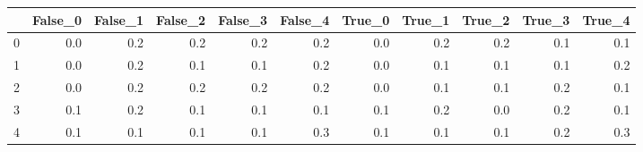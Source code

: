 \begin{tabular}{lrrrrrrrrrr}
\toprule
{} &  False\_0 &  False\_1 &  False\_2 &  False\_3 &  False\_4 &  True\_0 &  True\_1 &  True\_2 &  True\_3 &  True\_4 \\ \hline
\midrule
0 &      0.0 &      0.2 &      0.2 &      0.2 &      0.2 &     0.0 &     0.2 &     0.2 &     0.1 &     0.1 \\ \hline
1 &      0.0 &      0.2 &      0.1 &      0.1 &      0.2 &     0.0 &     0.1 &     0.1 &     0.1 &     0.2 \\ \hline
2 &      0.0 &      0.2 &      0.2 &      0.2 &      0.2 &     0.0 &     0.1 &     0.1 &     0.2 &     0.1 \\ \hline
3 &      0.1 &      0.2 &      0.1 &      0.1 &      0.1 &     0.1 &     0.2 &     0.0 &     0.2 &     0.1 \\ \hline
4 &      0.1 &      0.1 &      0.1 &      0.1 &      0.3 &     0.1 &     0.1 &     0.1 &     0.2 &     0.3 \\ \hline
\bottomrule
\end{tabular}
